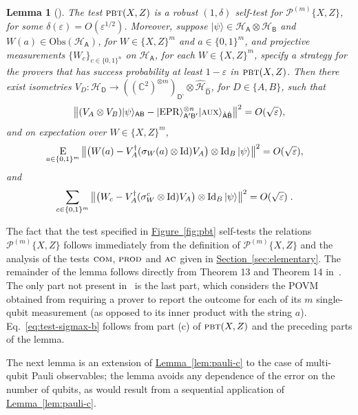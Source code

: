 \documentclass[11pt]{article}
\numberwithin{equation}{section}
\newtheorem{lemma}[theorem]{Lemma}
\theoremstyle{definition}
\theoremstyle{plain}
\newcommand{\C}{\mathbb C}
\newcommand{\expref}[2]{\hyperref[#2]{#1~\ref{#2}}}
\newcommand{\ket}[1]{|#1\rangle}
\newcommand{\Id}{\ensuremath{\mathop{\rm Id}\nolimits}}
\newcommand{\Es}[1]{\ensuremath{\mathop{\textsc{E}}}_{#1}} %
\newcommand{\setft}[1]{\mathrm{#1}}
\newcommand{\Obs}{\setft{Obs}}
\newcommand{\reg}[1]{{\textsf{#1}}}
\newcommand{\mH}{\mathcal{H}}
\newcommand{\eps}{\varepsilon}
\newcommand{\EPR}{{\rm EPR}}
\newcommand{\pbt}{\textsc{pbt}}
\newcommand{\aux}{\textsc {aux}}
\newcommand{\prodt}{\textsc{prod}}
\newcommand{\comt}{\textsc{com}}
\newcommand{\act}{\textsc{ac}}
\newcommand{\paulin}{\mathcal{P}^{(m)}\!}
\begin{document}
\begin{lemma}[\cite{natarajan2016robust}]\label{lem:pbt}
The test $\pbt(X,Z)$ is a robust $(1,\delta)$ self-test 
for $\paulin\{X,Z\}$, for some $\delta(\eps) = O(\eps^{1/2})$. Moreover, suppose $\ket{\psi}\in\mH_\reg{A}\otimes \mH_\reg{B}$ and $W(a) \in \Obs(\mH_\reg{A})$, for $W\in \{X,Z\}^m$ and $a\in\{0,1\}^m$, and projective measurements $\{W_c\}_{c\in \{0,1\}^n}$ on $\mH_\reg{A}$, for each $W\in\{X,Z\}^m$, specify a strategy for the provers that has success probability at least $1-\eps$ in $\pbt(X,Z)$. 
Then there exist isometries $V_D:\mH_\reg{D} \to ((\C^2)^{\otimes m})_{\reg{D'}}  \otimes \hat{\mH}_{\hat{\reg{D}}}$, for $D\in\{A,B\}$, such that
$$\big\| (V_A \otimes V_B) \ket{\psi}_{\reg{AB}} - \ket{\EPR}_{\reg{A}'\reg{B}'}^{\otimes n} \ket{\aux}_{\hat{\reg{A}}\hat{\reg{B}}} \big\|^2 = O(\sqrt{\eps}),$$
and on expectation over  $W\in \{X,Z\}^m$,
\begin{align}\label{eq:test-sigmax-a}
 \Es{a\in\{0,1\}^m} \big\| \big(W(a) -V_A^\dagger (\sigma_W(a) \otimes \Id) V_A\big) \otimes \Id_B \ket{\psi} \big\|^2 &= O(\sqrt{\eps}),
\end{align}
and
\begin{align}\label{eq:test-sigmax-b}
 \sum_{c\in\{0,1\}^m} \big\| \big(W_c -V_A^\dagger (\sigma_W^c \otimes \Id) V_A\big) \otimes \Id_B \ket{\psi} \big\|^2 &= O(\sqrt{\eps})\;.
\end{align}
\end{lemma}

The fact that the test specified in \expref{Figure}{fig:pbt} self-tests the relations $\paulin\{X,Z\}$ follows immediately from the definition of $\paulin\{X,Z\}$ and the analysis of the tests $\comt$, $\prodt$ and $\act$ given in \expref{Section}{sec:elementary}. The remainder of the lemma follows directly from Theorem 13 and Theorem 14 in~\cite{natarajan2016robust}. The only part not present in~\cite{natarajan2016robust} is the last part, which considers the POVM obtained from requiring a prover to report the outcome for each of its $m$ single-qubit measurement (as opposed to its inner product with the string $a$). Eq.~\eqref{eq:test-sigmax-b} follows  from part (c) of $\pbt(X,Z)$ and the preceding parts of the lemma. 

The next lemma is an extension of \expref{Lemma}{lem:pauli-c} to the case of multi-qubit Pauli observables; the lemma avoids any dependence of the error on the number of qubits, as would result from a sequential application of \expref{Lemma}{lem:pauli-c}.
\end{document}
